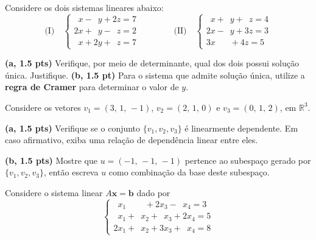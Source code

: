 \documentclass[12pt, addpoints]{exam}
\begin{document}
\begin{questions}

\question
Considere os dois sistemas lineares abaixo:
\[
  \text{(I)}\quad
  \begin{cases}
    \phantom{2}x - \phantom{2}y + 2z = 7 \\[2pt]
    2x + \phantom{2}y - \phantom{2}z = 2 \\[2pt]
    \phantom{2}x + 2y + \phantom{2}z = 7
  \end{cases}
  \qquad\qquad
  \text{(II)}\quad
  \begin{cases}
    \phantom{2}x + \phantom{2}y + \phantom{2}z = 4 \\[2pt]
    2x - \phantom{2}y + 3z = 3 \\[2pt]
    3x \phantom{{}+y{}} + 4z = 5
  \end{cases}
\]

\textbf{(a, 1.5 pts)} Verifique, por meio de determinante, qual dos dois possui solução única. Justifique. \textbf{(b, 1.5 pt)} Para o sistema que admite solução única, utilize a \textbf{regra de Cramer} para determinar o valor de $y$.



\question
Considere os vetores $v_1=(3,\,1,\,-1)$, $v_2=(2,\,1,\,0)$ e $v_3=(0,\,1,\,2)$, em $\mathbb{R}^3$.

\textbf{(a, 1.5 pts)} Verifique se o conjunto $\{v_1, v_2, v_3\}$ é linearmente dependente. Em caso afirmativo, exiba uma relação de dependência linear entre eles.

\textbf{(b, 1.5 pts)} Mostre que $u=(-1,\,-1,\,-1)$ pertence ao subespaço gerado por $\{v_1, v_2, v_3\}$, então escreva $u$ como combinação da base deste subespaço.

\question
Considere o sistema linear $A\mathbf{x} = \mathbf{b}$ dado por
\[
  \begin{cases}
    \phantom{2}x_1 \phantom{{}+x_2{}} + 2x_3 - \phantom{2}x_4 = 3\\[3pt]
    \phantom{2}x_1 + \phantom{2}x_2 + \phantom{2}x_3 + 2x_4 = 5\\[3pt]
    2x_1 + \phantom{2}x_2 + 3x_3 + \phantom{2}x_4 = 8
  \end{cases}
\]


\end{questions}
\end{document}
